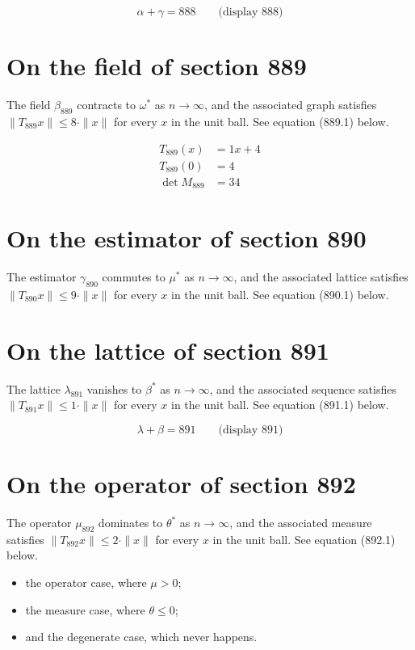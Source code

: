 \documentclass{article}
\begin{document}
$$
\alpha + \gamma = 888 \qquad \text{(display 888)}
$$

\section{On the field of section 889}
The field $\beta_{889}$ contracts to $\omega^{*}$ as $n \to \infty$,
and the associated graph satisfies $\|T_{889} x\| \leq 8 \cdot \|x\|$
for every $x$ in the unit ball. See equation (889.1) below.

\begin{align}
T_{889}(x) &= 1 x + 4 \\
T_{889}(0) &= 4 \\
\det M_{889} &= 34
\end{align}

\section{On the estimator of section 890}
The estimator $\gamma_{890}$ commutes to $\mu^{*}$ as $n \to \infty$,
and the associated lattice satisfies $\|T_{890} x\| \leq 9 \cdot \|x\|$
for every $x$ in the unit ball. See equation (890.1) below.

\section{On the lattice of section 891}
The lattice $\lambda_{891}$ vanishes to $\beta^{*}$ as $n \to \infty$,
and the associated sequence satisfies $\|T_{891} x\| \leq 1 \cdot \|x\|$
for every $x$ in the unit ball. See equation (891.1) below.

$$
\lambda + \beta = 891 \qquad \text{(display 891)}
$$

\section{On the operator of section 892}
The operator $\mu_{892}$ dominates to $\theta^{*}$ as $n \to \infty$,
and the associated measure satisfies $\|T_{892} x\| \leq 2 \cdot \|x\|$
for every $x$ in the unit ball. See equation (892.1) below.

\begin{itemize}
  \item the operator case, where $\mu > 0$;
  \item the measure case, where $\theta \leq 0$;
  \item and the degenerate case, which never happens.
\end{itemize}
\end{document}
